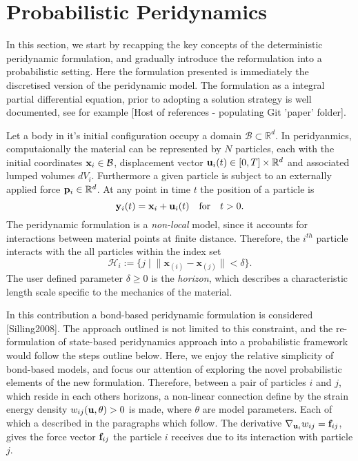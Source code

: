 \documentclass{article}
\begin{document}
\section{Probabilistic Peridynamics}

In this section, we start by recapping the key concepts of the deterministic peridynamic formulation, and gradually introduce the reformulation into a probabilistic setting. Here the formulation presented is immediately the discretised version of the peridynamic model. The formulation as a integral partial differential equation, prior to adopting a solution strategy is well documented, see for example [{\color{blue}Host of references - populating Git 'paper' folder}].

\smallskip
Let a body in it's initial configuration occupy a domain $\mathcal B \subset \mathbb R^d$. In peridyanmics, computaionally the material can be represented by $N$ particles, each with the initial coordinates ${\bf x}_i \in \mathcal B$, displacement vector ${\bf u}_i(t) \in [0,T] \times \mathbb R^d$ and associated lumped volumes $dV_i$. Furthermore a given particle is subject to an externally applied force ${\bf p}_i \in \mathbb R^d$. At any point in time $t$ the position of a particle is
$$
{\bf y}_i(t) = {\bf x}_i + {\bf u}_i(t) \quad \mbox{for} \quad t > 0.
$$
The peridynamic formulation is a {\em non-local} model, since it accounts for interactions between material points at finite distance. Therefore, the $i^{th}$ particle interacts with the all particles within the index set
$$
\mathcal H_i := \{ j \; | \; \| \textbf{x}_{(i)} - \textbf{x}_{(j)} \|< \delta \}.
$$
The user defined parameter $\delta \geq 0$ is the {\em horizon}, which describes a characteristic length scale specific to the mechanics of the material.

\smallskip
In this contribution a bond-based peridynamic formulation is considered [Silling2008]. The approach outlined is not limited to this constraint, and the re-formulation of state-based peridynamics approach into a probabilistic framework would follow the steps outline below. Here, we enjoy the relative simplicity of bond-based models, and focus our attention of exploring the novel probabilistic elements of the new formulation.  Therefore, between a pair of particles $i$ and $j$, which reside in each others horizons, a non-linear connection define by the strain energy density $w_{ij}({\bf u}, \theta) > 0$ is made, where $\theta$ are model parameters. Each of which a described in the paragraphs which follow. The derivative $\nabla_{{\bf u}_i} w_{ij} = {\bf f}_{ij}$, gives the force vector ${\bf f}_{ij}$ the particle $i$ receives due to its interaction with particle $j$.
\end{document}
